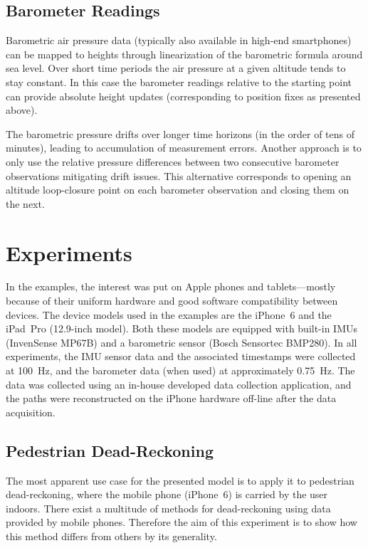 \documentclass[conference]{ieeetran}
\begin{document}
\subsection{Barometer Readings}
\noindent
Barometric air pressure data (typically also available in high-end smartphones) can be mapped to heights through linearization of the barometric formula around sea level. Over short time periods the air pressure at a given altitude tends to stay constant. In this case the barometer readings relative to the starting point can provide absolute height updates (corresponding to position fixes as presented above).

The barometric pressure drifts over longer time horizons (in the order of tens of minutes), leading to accumulation of measurement errors. Another approach is to only use the relative pressure differences between two consecutive barometer observations mitigating drift issues. This alternative corresponds to opening an altitude loop-closure point on each barometer observation and closing them on the next.


\section{Experiments}
\label{sec:experiments}
\noindent
In the examples, the interest was put on Apple phones and tablets---mostly because of their uniform hardware and good software compatibility between devices. The device models used in the examples are the iPhone~6 and the iPad~Pro (12.9-inch model). Both these models are equipped with built-in IMUs (InvenSense MP67B) and a barometric sensor (Bosch Sensortec BMP280). In all experiments, the IMU sensor data and the associated timestamps were collected at 100~Hz, and the barometer data (when used) at approximately 0.75~Hz. The data was collected using an in-house developed data collection application, and the paths were reconstructed on the iPhone hardware off-line after the data acquisition.


\subsection{Pedestrian Dead-Reckoning}
\noindent
The most apparent use case for the presented model is to apply it to pedestrian dead-reckoning, where the mobile phone (iPhone~6) is carried by the user indoors. There exist a multitude of methods for dead-reckoning using data provided by mobile phones. Therefore the aim of this experiment is to show how this method differs from others by its generality.
\end{document}
